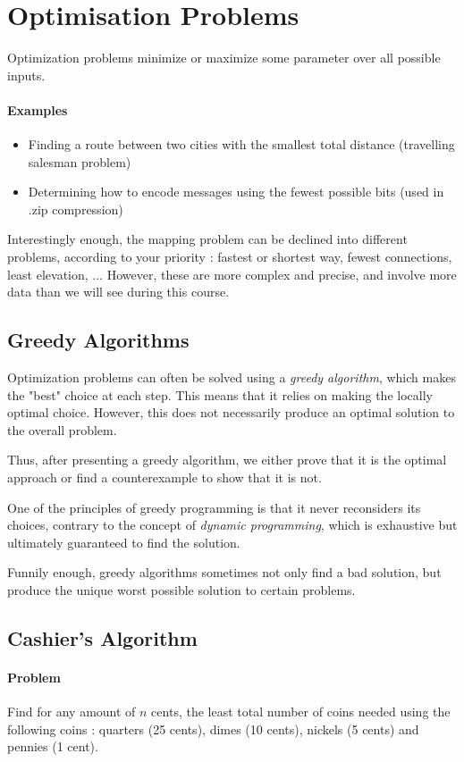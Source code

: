 \documentclass[10pt,a4paper]{book}
\newcommand{\ind}{\hspace*{\parindent}}
\begin{document}
\section{Optimisation Problems}
Optimization problems minimize or maximize some parameter over all possible inputs. 
\paragraph*{Examples}
\begin{itemize}
\item Finding a route between two cities with the smallest total distance (travelling salesman problem)
\item Determining how to encode messages using the fewest possible bits (used in .zip compression)
\end{itemize}
Interestingly enough, the mapping problem can be declined into different problems, according to your priority : fastest or shortest way, fewest connections, least elevation, ... However, these are more complex and precise, and involve more data than we will see during this course.

\subsection{Greedy Algorithms}
\ind Optimization problems can often be solved using a \textit{greedy algorithm}, which makes the "best" choice at each step. This means that it relies on making the locally optimal choice. However, this does not necessarily produce an optimal solution to the overall problem.\par
Thus, after presenting a greedy algorithm, we either prove that it is the optimal approach or find a counterexample to show that it is not.\par
One of the principles of greedy programming is that it never reconsiders its choices, contrary to the concept of \textit{dynamic programming}, which is exhaustive but ultimately guaranteed to find the solution.\par
Funnily enough, greedy algorithms sometimes not only find a bad solution, but produce the unique worst possible solution to certain problems.

\subsection{Cashier's Algorithm}
\paragraph*{Problem}
Find for any amount of $n$ cents, the least total number of coins needed using the following coins : quarters (25 cents), dimes (10 cents), nickels (5 cents) and pennies (1 cent).
\end{document}

